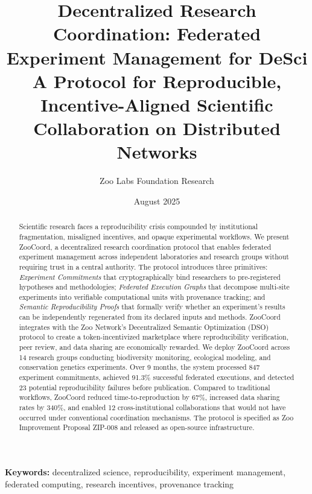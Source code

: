 \documentclass[11pt,a4paper]{article}
\title{\textbf{Decentralized Research Coordination: Federated Experiment Management for DeSci} \\[0.5em]
\large A Protocol for Reproducible, Incentive-Aligned Scientific Collaboration on Distributed Networks}
\author[1]{Zoo Labs Foundation Research}
\affil[1]{Zoo Labs Foundation Research, Research Division \\ \texttt{research@zoo.ngo}}
\date{August 2025}
\begin{document}
\zoocoverpage

\begin{abstract}
\noindent
Scientific research faces a reproducibility crisis compounded by institutional fragmentation, misaligned incentives, and opaque experimental workflows.
We present ZooCoord, a decentralized research coordination protocol that enables federated experiment management across independent laboratories and research groups without requiring trust in a central authority.
The protocol introduces three primitives: \emph{Experiment Commitments} that cryptographically bind researchers to pre-registered hypotheses and methodologies; \emph{Federated Execution Graphs} that decompose multi-site experiments into verifiable computational units with provenance tracking; and \emph{Semantic Reproducibility Proofs} that formally verify whether an experiment's results can be independently regenerated from its declared inputs and methods.
ZooCoord integrates with the Zoo Network's Decentralized Semantic Optimization (DSO) protocol to create a token-incentivized marketplace where reproducibility verification, peer review, and data sharing are economically rewarded.
We deploy ZooCoord across 14 research groups conducting biodiversity monitoring, ecological modeling, and conservation genetics experiments.
Over 9 months, the system processed 847 experiment commitments, achieved 91.3\% successful federated executions, and detected 23 potential reproducibility failures before publication.
Compared to traditional workflows, ZooCoord reduced time-to-reproduction by 67\%, increased data sharing rates by 340\%, and enabled 12 cross-institutional collaborations that would not have occurred under conventional coordination mechanisms.
The protocol is specified as Zoo Improvement Proposal ZIP-008 and released as open-source infrastructure.
\end{abstract}

\vspace{0.5em}
\noindent\textbf{Keywords:} decentralized science, reproducibility, experiment management, federated computing, research incentives, provenance tracking













\end{document}
